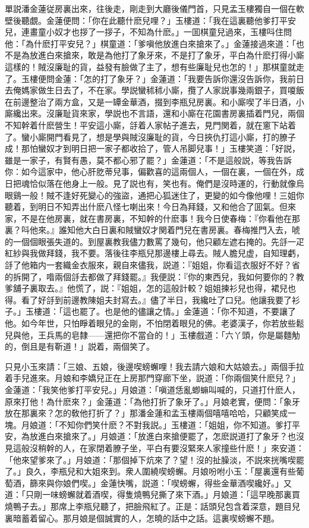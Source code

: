 單説潘金蓮従房裏出來，往後走，剛走到大廳後儀門首，只見孟玉樓獨自一個在軟壁後聽覷。金蓮便問：「你在此聽什麽兒哩？」玉樓道：「我在這裏聽他爹打平安兒，連畫童小奴才也拶了一拶子，不知為什麽。」一囬棋童兒過來，玉樓呌住問他：「為什麽打平安兒？」棋童道：「爹嗔他放進白來搶來了。」金蓮接過來道：「也不是為放進白來搶來，敢是為他打了象牙來，不是打了象牙，平白為什麽打得小廝這樣的！賊沒廉耻的貨，益發有臉做了主了，想有些廉耻兒也怎的！」那棋童就走了。玉樓便問金蓮：「怎的打了象牙？」金蓮道：「我要告訴你還沒告訴你，我前日去俺媽家做生日去了，不在家。學説蠻秫秫小廝，攬了人家説事幾兩銀子，買嗄飯在前邊整治了兩方盒，又是一罈金華酒，掇到李瓶兒房裏。和小廝喫了半日酒，小廝纔出來。沒廉耻貨來家，學説也不言語，還和小廝在花園書房裏插着門兒，兩個不知幹着什麽營生！平安這小廝，㧱着人家帖子進去，見門関着，就在窻下站着了。蠻小廝開門看見了，想是學與賊沒廉耻的貨，今日挾仇打這小廝，打的膫子成！那怕蠻奴才到明日把一家子都收拾了，管人吊脚兒事！」玉樓笑道：「好説，雖是一家子，有賢有愚，莫不都心邪了罷？」金蓮道：「不是這般説，等我告訴你：如今這家中，他心肝肐蒂兒事，偏歡喜的這兩個人，一個在裏，一個在外，成日把魂恰似落在他身上一般。見了説也有，笑也有。俺們是沒時運的，行動就像烏眼鷄一般！賊不逢好死變心的強盜，通把心狐迷住了，更變的如今像他哩！三姐你聽着，到明日不知弄出什麽八怪七喇出來！今日為拜錢，又和他合了囬氣。但來家，不是在他房裏，就在書房裏，不知幹的什麽事！我今日使春梅：『你看他在那裏？呌他來。』誰知他大白日裏和賊蠻奴才関着門兒在書房裏。春梅推門入去，唬的一個個眼張失道的。到屋裏教我儘力數罵了幾句，他只顧左遮右掩的。先㧱一疋紅紗與我做拜錢，我不要。落後往李瓶兒那邊樓上尋去。賊人膽兒虚，自知理虧，㧱了他箱内一套織金衣服來，親自來儘我，説道：『姐姐，你看這衣服好不好？省的拆開了，喒兩個㧱去都做了拜錢罷。』我便説：『你的東西兒，我如何要你的？教爹舖子裏取去。』他慌了，説：『姐姐，怎的這般計較？姐姐揀衫兒也得，裙兒也得。看了好㧱到前邊教陳姐夫封寫去。』儘了半日，我纔吐了口兒。他讓我要了衫子。」玉樓道：「這也罷了。也是他的儘讓之情。」金蓮道：「你不知道，不要讓了他。如今年世，只怕睜着眼兒的金剛，不怕閉着眼兒的佛。老婆漢子，你若放些鬆兒與他，王兵馬的皂隸——還把你不當㒲的！」玉樓戲道：「六丫頭，你是屬麵觔的，倒且是有靳道！」説着，兩個笑了。

只見小玉來請：「三娘、五娘，後邊喫螃蠏哩！我去請六娘和大姑娘去。」兩個手拉着手兒進來。月娘和李嬌兒正在上房那門穿廊下坐，説道：「你兩個笑什麽兒？」金蓮道：「我笑他爹打平安兒。」月娘道：「嗔道恁亂蝍䗫叫喊的，只道打什麽人，原來打他！為什麽來？」金蓮道：「為他打折了象牙了。」月娘老實，便問：「象牙放在那裏來？怎的敎他打折了？」那潘金蓮和孟玉樓兩個嘻嘻哈哈，只顧笑成一塊。月娘道：「不知你們笑什麽？不對我説。」玉樓道：「姐姐，你不知道。爹打平安，為放進白來搶來了。」月娘道：「放進白來搶便罷了，怎麽説道打了象牙？也沒見這般沒稍幹的人，在家閉着膫子坐，平白有要沒緊來人家撞些什麽！」來安道：「他來望爹來了。」月娘道：「那個掉下炕來了？望！沒的扯臊淡，不説來挄嘴喫罷了。」良久，李瓶兒和大姐來到。衆人圍繞喫螃蠏。月娘吩咐小玉：「屋裏還有些葡萄酒，篩來與你娘們喫。」金蓮快嘴，説道：「喫螃蠏，得些金華酒喫纔好。」又道：「只剛一味螃蠏就着酒喫，得隻燒鴨兒撕了來下酒。」月娘道：「這早晚那裏買燒鴨子去。」那席上李瓶兒聽了，把臉飛紅了。正是：話頭兒包含着深意，題目兒裏暗蓄着留心。那月娘是個誠實的人，怎曉的話中之話。這裏喫螃蠏不題。

